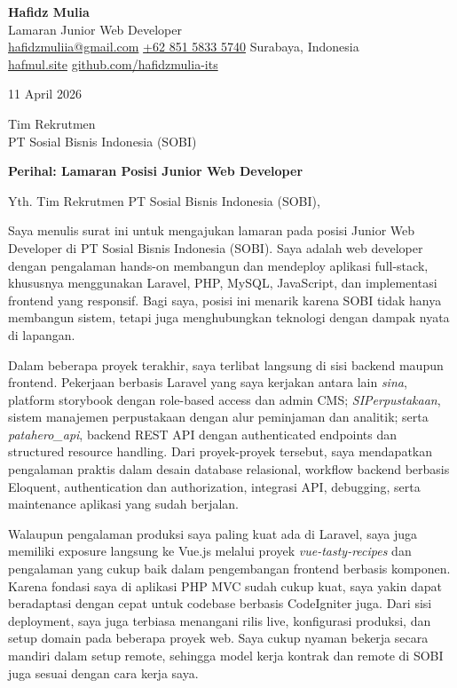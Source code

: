 \documentclass[a4paper,11pt]{article}
\begin{document}
{\LARGE\bfseries Hafidz Mulia}\\
{\color{accent}Lamaran Junior Web Developer}\\
\href{mailto:hafidzmuliia@gmail.com}{hafidzmuliia@gmail.com} \quad\textbar\quad
\href{tel:+6285158335740}{+62 851 5833 5740} \quad\textbar\quad
Surabaya, Indonesia\\
\href{https://hafmul.site}{hafmul.site} \quad\textbar\quad
\href{https://github.com/hafidzmulia-its}{github.com/hafidzmulia-its}

\vspace{12pt}

11 April 2026

\vspace{12pt}

Tim Rekrutmen\\
PT Sosial Bisnis Indonesia (SOBI)

\vspace{12pt}

\textbf{Perihal: Lamaran Posisi Junior Web Developer}

\vspace{12pt}

Yth. Tim Rekrutmen PT Sosial Bisnis Indonesia (SOBI),

Saya menulis surat ini untuk mengajukan lamaran pada posisi Junior Web Developer di PT Sosial Bisnis Indonesia (SOBI). Saya adalah web developer dengan pengalaman hands-on membangun dan mendeploy aplikasi full-stack, khususnya menggunakan Laravel, PHP, MySQL, JavaScript, dan implementasi frontend yang responsif. Bagi saya, posisi ini menarik karena SOBI tidak hanya membangun sistem, tetapi juga menghubungkan teknologi dengan dampak nyata di lapangan.

Dalam beberapa proyek terakhir, saya terlibat langsung di sisi backend maupun frontend. Pekerjaan berbasis Laravel yang saya kerjakan antara lain \textit{sina}, platform storybook dengan role-based access dan admin CMS; \textit{SIPerpustakaan}, sistem manajemen perpustakaan dengan alur peminjaman dan analitik; serta \textit{patahero\_api}, backend REST API dengan authenticated endpoints dan structured resource handling. Dari proyek-proyek tersebut, saya mendapatkan pengalaman praktis dalam desain database relasional, workflow backend berbasis Eloquent, authentication dan authorization, integrasi API, debugging, serta maintenance aplikasi yang sudah berjalan.

Walaupun pengalaman produksi saya paling kuat ada di Laravel, saya juga memiliki exposure langsung ke Vue.js melalui proyek \textit{vue-tasty-recipes} dan pengalaman yang cukup baik dalam pengembangan frontend berbasis komponen. Karena fondasi saya di aplikasi PHP MVC sudah cukup kuat, saya yakin dapat beradaptasi dengan cepat untuk codebase berbasis CodeIgniter juga. Dari sisi deployment, saya juga terbiasa menangani rilis live, konfigurasi produksi, dan setup domain pada beberapa proyek web. Saya cukup nyaman bekerja secara mandiri dalam setup remote, sehingga model kerja kontrak dan remote di SOBI juga sesuai dengan cara kerja saya.
\end{document}
